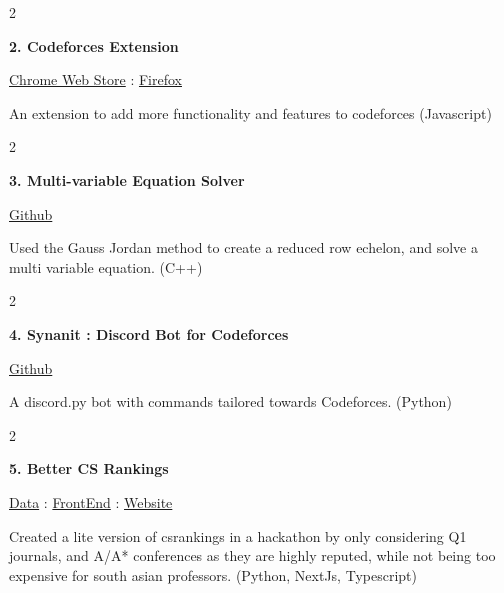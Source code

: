 \documentclass[10pt, letterpaper]{article}
\newenvironment{twocolentry}[2][]{
    \onecolentry
    \def\secondColumn{#2}
    \setcolumnwidth{\fill, 4.7 cm} %
    \begin{paracol}{2}
}{
    \switchcolumn \raggedleft \secondColumn
    \end{paracol}
    \endonecolentry
}
\begin{document}
        \begin{twocolentry}{
            \href{https://chromewebstore.google.com/detail/codeforces-helper/ahoeafmlmoohkkalcickdnkifpfnolpj}{Chrome Web Store} : \href{https://addons.mozilla.org/en-US/firefox/addon/codeforces-helper/}{Firefox}
        }
            \textbf{2. Codeforces Extension}
        \end{twocolentry}

        \vspace{0.15 cm} %
        An extension to add more functionality and features to codeforces (Javascript)

        \vspace{0.3 cm} %

        \begin{twocolentry}{
            \href{https://github.com/Darelife/MultiEquationSolver}{Github}
        }
            \textbf{3. Multi-variable Equation Solver}
        \end{twocolentry}

        \vspace{0.15 cm} %
        Used the Gauss Jordan method to create a reduced row echelon, and solve a multi variable equation. (C++)

        \vspace{0.3 cm} %

        \begin{twocolentry}{
            \href{https://github.com/Darelife/synanit2.0}{Github}
        }
            \textbf{4. Synanit : Discord Bot for Codeforces}
        \end{twocolentry}

        \vspace{0.15 cm} %
        A discord.py bot with commands tailored towards Codeforces. (Python)

        \vspace{0.3 cm} %

        \begin{twocolentry}{%
            \href{https://github.com/Darelife/HackenzaHackathon}{Data} : 
            \href{https://github.com/arin-r/better-csrankings}{FrontEnd} : 
            \href{https://better-csrankings.vercel.app/}{Website}%
        }
            \textbf{5. Better CS Rankings}
        \end{twocolentry}

        \vspace{0.15 cm} %
        Created a lite version of csrankings in a hackathon by only considering Q1 journals, and A/A* conferences as they are highly reputed, while not being too expensive for south asian professors. (Python, NextJs, Typescript)
\end{document}

